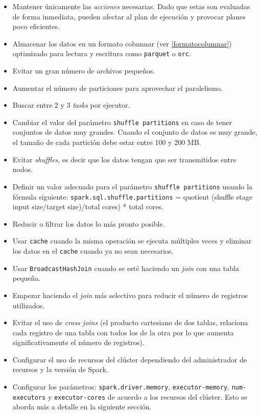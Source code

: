 \begin{itemize}
	\item Mantener únicamente las \textit{acciones} necesarias. Dado que estas son evaluadas de forma inmediata, pueden afectar al plan de ejecución y provocar planes poco eficientes.
	\item Almacenar los datos en un formato columnar (ver \ref{formatocolumnar}) optimizado para lectura y escritura como \texttt{parquet} o \texttt{orc}.
	\item Evitar un gran número de archivos pequeños.
	\item Aumentar el número de particiones para aprovechar el paralelismo.
	\item Buscar entre 2 y 3 \textit{tasks} por ejecutor.
	\item Cambiar el valor del parámetro \texttt{shuffle partitions} en caso de tener conjuntos de datos muy grandes. Cuando el conjunto de datos es muy grande, el tamaño de cada partición debe estar entre 100 y 200 MB. 
	\item Evitar \textit{shuffles}, es decir que los datos tengan que ser transmitidos entre nodos.
	\item Definir un valor adecuado para el parámetro \texttt{shuffle partitions} usando la fórmula siguiente: \texttt{spark.sql.shuffle.partitions} = quotient (shuffle stage input size/target size)/total cores) * total cores.
	\item Reducir o filtrar los datos lo más pronto posible.
	\item Usar \texttt{cache} cuando la misma operación se ejecuta múltiples veces y eliminar los datos en el \texttt{cache} cuando ya no sean necesarios.
	\item Usar \texttt{BroadcastHashJoin} cuando se esté haciendo un \textit{join} con una tabla pequeña.
	\item Empezar haciendo el \textit{join} más selectivo para reducir el número de registros utilizados.
	\item Evitar el uso de \textit{cross joins} (el producto cartesiano de dos tablas, relaciona cada registro de una tabla con todos los de la otra por lo que aumenta significativamente el número de registros).
	\item Configurar el uso de recursos del clúster dependiendo del administrador de recursos y la versión de Spark.
	\item Configurar los parámetros: \texttt{spark.driver.memory}, \texttt{executor-memory}, \texttt{num-executors} y \texttt{executor-cores} de acuerdo a los recursos del clúster. Esto se aborda más a detalle en la siguiente sección.

\end{itemize}

